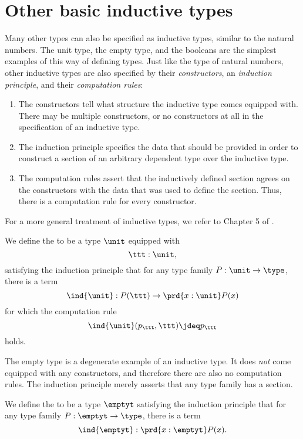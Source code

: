 \section{Other basic inductive types}
Many other types can also be specified as inductive types, similar to the natural numbers. The unit type, the empty type, and the booleans are the simplest examples of this way of defining types. Just like the type of natural numbers, other inductive types are also specified by their \emph{constructors}, an \emph{induction principle}, and their \emph{computation rules}: 
\begin{enumerate}
\item The constructors tell what structure the inductive type comes equipped with. There may be multiple constructors, or no constructors at all in the specification of an inductive type. 
\item The induction principle specifies the data that should be provided in order to construct a section of an arbitrary dependent type over the inductive type. 
\item The computation rules assert that the inductively defined section agrees on the constructors with the data that was used to define the section. Thus, there is a computation rule for every constructor.
\end{enumerate}
For a more general treatment of inductive types, we refer to Chapter 5 of \cite{hottbook}.
\begin{defn}
We define the  to be a type $\unit$ equipped with
\begin{equation*}
\ttt:\unit,
\end{equation*}
satisfying the induction principle that for any type family $P:\unit\to\type$, there is a term
\begin{equation*}
\ind{\unit} : P(\ttt)\to\prd{x:\unit}P(x)
\end{equation*}
for which the computation rule
\begin{equation*}
\ind{\unit}(p_{\ttt},\ttt) \jdeq p_\ttt
\end{equation*}
holds.
\end{defn}

The empty type is a degenerate example of an inductive type. It does \emph{not} come equipped with any constructors, and therefore there are also no computation rules. The induction principle merely asserts that any type family has a section.
\begin{defn}
We define the  to be a type $\emptyt$ satisfying the induction principle that for any type family $P:\emptyt\to\type$, there is a term
\begin{equation*}
\ind{\emptyt} : \prd{x:\emptyt}P(x).
\end{equation*}
\end{defn}

